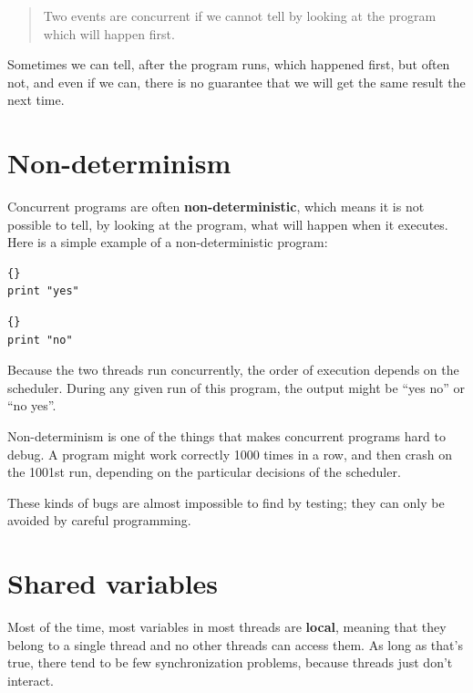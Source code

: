 \documentclass{book}
\begin{document}
\begin{quote}
    Two events are concurrent if we cannot tell by looking at
    the program which will happen first.
\end{quote}

Sometimes we can tell, after the program runs, which happened first,
but often not, and even if we can, there is no guarantee that we will
get the same result the next time.


\section {Non-determinism}

Concurrent programs are often {\bf non-deterministic}, which means it
is not possible to tell, by looking at the program, what will happen
when it executes.  Here is a simple example of a
non-deterministic program:

\begin{minipage}[t]{0.4\textwidth}
    \begin{lstlisting}[title={Thread A}]{}
print "yes"
\end{lstlisting}
\end{minipage}
\hfill
\begin{minipage}[t]{0.4\textwidth}
    \begin{lstlisting}[title={Thread B}]{}
print "no"
\end{lstlisting}
\end{minipage}

Because the two threads run concurrently, the order of
execution depends on the scheduler.  During any given run
of this program, the output might be ``yes no'' or ``no yes''.

Non-determinism is one of the things that makes concurrent
programs hard to debug.  A program might work correctly
1000 times in a row, and then crash on the 1001st run, depending
on the particular decisions of the scheduler.

These kinds of bugs are almost impossible to find by testing;
they can only be avoided by careful programming.


\section {Shared variables}
\label{shared}

Most of the time, most variables in most threads are {\bf local},
meaning that they belong to a single thread and no other threads
can access them.  As long as that's true, there tend to be few
synchronization problems, because threads just don't interact.
\end{document}
